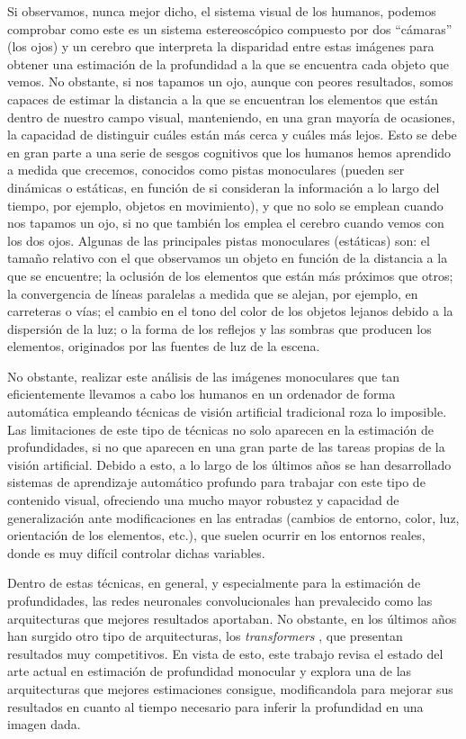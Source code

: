 Si observamos, nunca mejor dicho, el sistema visual de los humanos, podemos comprobar como este es un sistema estereoscópico compuesto por dos  ``cámaras''  (los ojos) y un cerebro que interpreta la disparidad entre estas imágenes para obtener una estimación de la profundidad a la que se encuentra cada objeto que vemos. No obstante, si nos tapamos un ojo, aunque con peores resultados, somos capaces de estimar la distancia a la que se encuentran los elementos que están dentro de nuestro campo visual, manteniendo, en una gran mayoría de ocasiones, la capacidad de distinguir cuáles están más cerca y cuáles más lejos. Esto se debe en gran parte a una serie de sesgos cognitivos que los humanos hemos aprendido a medida que crecemos, conocidos como pistas monoculares (pueden ser dinámicas o estáticas, en función de si consideran la información a lo largo del tiempo, por ejemplo, objetos en movimiento), y que no solo se emplean cuando nos tapamos un ojo, si no que también los emplea el cerebro cuando vemos con los dos ojos. Algunas de las principales pistas monoculares (estáticas) \cite{Kalloniatis2005-pc} son: el tamaño relativo con el que observamos un objeto en función de la distancia a la que se encuentre; la oclusión de los elementos que están más próximos que otros; la convergencia de líneas paralelas a medida que se alejan, por ejemplo, en carreteras o vías; el cambio en el tono del color de los objetos lejanos debido a la dispersión de la luz; o la forma de los reflejos y las sombras que producen los elementos, originados por las fuentes de luz de la escena.

No obstante, realizar este análisis de las imágenes monoculares que tan eficientemente llevamos a cabo los humanos en un ordenador de forma automática empleando técnicas de visión artificial tradicional roza lo imposible. Las limitaciones de este tipo de técnicas no solo aparecen en la estimación de profundidades, si no que aparecen en una gran parte de las tareas propias de la visión artificial. Debido a esto, a lo largo de los últimos años se han desarrollado sistemas de aprendizaje automático profundo para trabajar con este tipo de contenido visual, ofreciendo una mucho mayor robustez y capacidad de generalización ante modificaciones en las entradas (cambios de entorno, color, luz, orientación de los elementos, etc.), que suelen ocurrir en los entornos reales, donde es muy difícil controlar dichas variables.

Dentro de estas técnicas, en general, y especialmente para la estimación de profundidades, las redes neuronales convolucionales han prevalecido como las arquitecturas que mejores resultados aportaban. No obstante, en los últimos años han surgido otro tipo de arquitecturas, los \textit{transformers} \cite{NIPS2017_3f5ee243}, que presentan resultados muy competitivos. En vista de esto, este trabajo revisa el estado del arte actual en estimación de profundidad monocular y explora una de las arquitecturas que mejores estimaciones consigue, modificandola para mejorar sus resultados en cuanto al tiempo necesario para inferir la profundidad en una imagen dada. 

